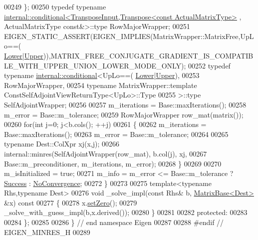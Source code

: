 \begin{DoxyCode}
00249             \};
00250             \textcolor{keyword}{typedef} \textcolor{keyword}{typename} 
      \hyperlink{struct_eigen_1_1internal_1_1conditional}{internal::conditional<TransposeInput,Transpose<const ActualMatrixType>}
      , ActualMatrixType \textcolor{keyword}{const}&>::type RowMajorWrapper;
00251             EIGEN\_STATIC\_ASSERT(EIGEN\_IMPLIES(MatrixWrapper::MatrixFree,UpLo==(
      \hyperlink{group__enums_gga39e3366ff5554d731e7dc8bb642f83cda891792b8ed394f7607ab16dd716f60e6}{Lower}|\hyperlink{group__enums_gga39e3366ff5554d731e7dc8bb642f83cda6bcb58be3b8b8ec84859ce0c5ac0aaec}{Upper})),MATRIX\_FREE\_CONJUGATE\_GRADIENT\_IS\_COMPATIBLE\_WITH\_UPPER\_UNION\_LOWER\_MODE\_ONLY);
00252             \textcolor{keyword}{typedef} \textcolor{keyword}{typename} \hyperlink{struct_eigen_1_1internal_1_1conditional}{internal::conditional}<UpLo==(
      \hyperlink{group__enums_gga39e3366ff5554d731e7dc8bb642f83cda891792b8ed394f7607ab16dd716f60e6}{Lower}|\hyperlink{group__enums_gga39e3366ff5554d731e7dc8bb642f83cda6bcb58be3b8b8ec84859ce0c5ac0aaec}{Upper}),
00253                                                   RowMajorWrapper,
00254                                                   \textcolor{keyword}{typename} MatrixWrapper::template 
      ConstSelfAdjointViewReturnType<UpLo>::Type
00255                                             >::type SelfAdjointWrapper;
00256 
00257             m\_iterations = Base::maxIterations();
00258             m\_error = Base::m\_tolerance;
00259             RowMajorWrapper row\_mat(matrix());
00260             \textcolor{keywordflow}{for}(\textcolor{keywordtype}{int} j=0; j<b.cols(); ++j)
00261             \{
00262                 m\_iterations = Base::maxIterations();
00263                 m\_error = Base::m\_tolerance;
00264                 
00265                 \textcolor{keyword}{typename} Dest::ColXpr xj(x,j);
00266                 internal::minres(SelfAdjointWrapper(row\_mat), b.col(j), xj,
00267                                  Base::m\_preconditioner, m\_iterations, m\_error);
00268             \}
00269             
00270             m\_isInitialized = \textcolor{keyword}{true};
00271             m\_info = m\_error <= Base::m\_tolerance ? \hyperlink{group__enums_gga85fad7b87587764e5cf6b513a9e0ee5ea52581b035f4b59c203b8ff999ef5fcea}{Success} : 
      \hyperlink{group__enums_gga85fad7b87587764e5cf6b513a9e0ee5eaba1c8763d1179778070f365ecc4157a8}{NoConvergence};
00272         \}
00273         
00275         \textcolor{keyword}{template}<\textcolor{keyword}{typename} Rhs,\textcolor{keyword}{typename} Dest>
00276         \textcolor{keywordtype}{void} \_solve\_impl(\textcolor{keyword}{const} Rhs& b, \hyperlink{group___core___module_class_eigen_1_1_matrix_base}{MatrixBase<Dest>} &x)\textcolor{keyword}{ const}
00277 \textcolor{keyword}{        }\{
00278             x.\hyperlink{group___core___module_ac74411ddeea2545bf20baf14613be47e}{setZero}();
00279             \_solve\_with\_guess\_impl(b,x.derived());
00280         \}
00281         
00282     \textcolor{keyword}{protected}:
00283         
00284     \};
00285 
00286 \} \textcolor{comment}{// end namespace Eigen}
00287 
00288 \textcolor{preprocessor}{#endif // EIGEN\_MINRES\_H}
00289 
\end{DoxyCode}
